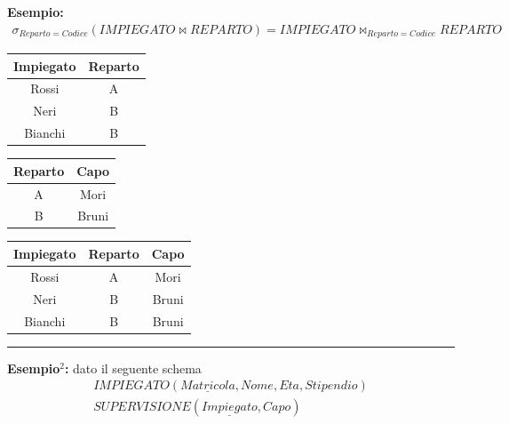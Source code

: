 \documentclass{article}
\begin{document}
\textbf{Esempio:}
\begin{align*}
    \sigma_{Reparto =Codice} (IMPIEGATO \bowtie REPARTO) = IMPIEGATO \bowtie_{Reparto = Codice}REPARTO
\end{align*}


\noindent \begin{minipage}{.25\textwidth}
  \centering
    \begin{tabular}{|c|c|}
        \hline
        \textbf{Impiegato} & \textbf{Reparto} \\
        \hline
        Rossi & A \\
        \hline
        Neri &  B \\
        \hline
        Bianchi & B \\
         \hline
        \end{tabular}
\end{minipage}%
\hspace{1em}
\begin{minipage}{.25\textwidth}
  \centering
       \begin{tabular}{|c|c|}
        \hline
        \textbf{Reparto} & \textbf{Capo} \\
        \hline
        A & Mori\\
        \hline
        B & Bruni\\
         \hline
        \end{tabular}
\end{minipage}
\hspace{0.1em}
\begin{minipage}{.5\textwidth}
  \centering
       \begin{tabular}{|c|c|c|}
        \hline
        \textbf{Impiegato} & \textbf{Reparto} & \textbf{Capo} \\
        \hline
        Rossi & A & Mori\\
         \hline
         Neri & B & Bruni\\
         \hline
         Bianchi & B & Bruni \\
         \hline
        \end{tabular}
\end{minipage}
\vspace{1em}
\noindent\hrule
\vspace{1em}
\textbf{Esempio$^2$:} dato il seguente schema
\begin{align*}
    IMPIEGATO(\underline{Matricola}, Nome, Eta, Stipendio) \\
    SUPERVISIONE(\underline{Impiegato},Capo)
\end{align*}
\end{document}
